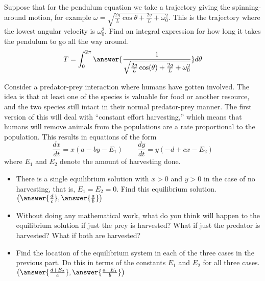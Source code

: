 \documentclass{ximera}
\begin{document}
\begin{exercise}
    Suppose that for the pendulum equation we take a trajectory giving the spinning-around motion, for example $\omega = \sqrt{\frac{2g}{L} \cos \theta + \frac{2g}{L} + \omega_0^2}$.  This is the trajectory where the lowest angular velocity is $\omega_0^2$.  Find an integral expression for how long it takes the pendulum to go all the way around.
    \[
        T = \int_0^{2\pi} \answer{\frac{1}{\sqrt{\frac{2g}{L}\cos(\theta) + \frac{2g}{L} + \omega_0^2}}} d\theta
    \]
\end{exercise}


\begin{exercise}
    Consider a predator-prey interaction where humans have gotten involved. The idea is that at least one of the species is valuable for food or another resource, and the two species still intact in their normal predator-prey manner. The first version of this will deal with ``constant effort harvesting,'' which means that humans will remove animals from the populations are a rate proportional to the population. This results in equations of the form
    \[ 
        \frac{dx}{dt} = x(a - by - E_1) \qquad \frac{dy}{dt} = y(-d + cx - E_2) 
    \] 
    where $E_1$ and $E_2$ denote the amount of harvesting done.
    \begin{itemize}
        \item There is a single equilibrium solution with $x > 0$ and $y>0$ in the case of no harvesting, that is, $E_1 = E_2 = 0$. Find this equilibrium solution. $\left(\answer{\frac{d}{c}}, \answer{\frac{a}{b}}\right)$
        \item Without doing any mathematical work, what do you think will happen to the equilibrium solution if just the prey is harvested? What if just the predator is harvested? What if both are harvested?
        \item Find the location of the equilibrium system in each of the three cases in the previous part. Do this in terms of the constants $E_1$ and $E_2$ for all three cases. \\
            $\left(\answer{\frac{d+E_2}{c}}, \answer{\frac{a-E_1}{b}}\right)$
    \end{itemize}
\end{exercise}
\end{document}
